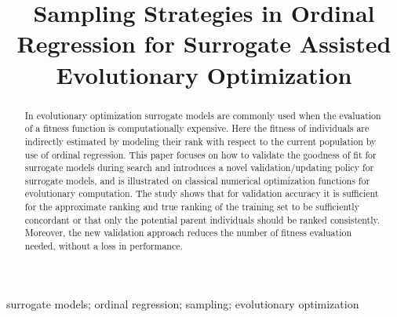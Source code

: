 \documentclass[10pt, conference]{IEEEtran} %
\begin{document}
%
\title{Sampling Strategies in Ordinal Regression for Surrogate Assisted Evolutionary Optimization}


\author{
}








\maketitle


\begin{abstract}
  In evolutionary optimization surrogate models are commonly used when the evaluation of a fitness function is computationally expensive. Here the fitness of individuals are indirectly estimated by modeling their rank with respect to the current population by use of ordinal regression. 
  This paper focuses on how to validate the goodness of fit for surrogate models during search and introduces a novel validation/updating policy for surrogate models, and is illustrated on classical numerical optimization functions for evolutionary computation. The study shows that for validation accuracy it is sufficient for the approximate ranking and true ranking of the training set to be sufficiently concordant or that only the potential parent individuals  should be ranked consistently. Moreover, the new validation approach reduces the number of fitness evaluation needed, without a loss in performance.
\end{abstract}

\begin{IEEEkeywords}
surrogate models; ordinal regression; sampling; evolutionary optimization
\end{IEEEkeywords}

%
\end{document}
